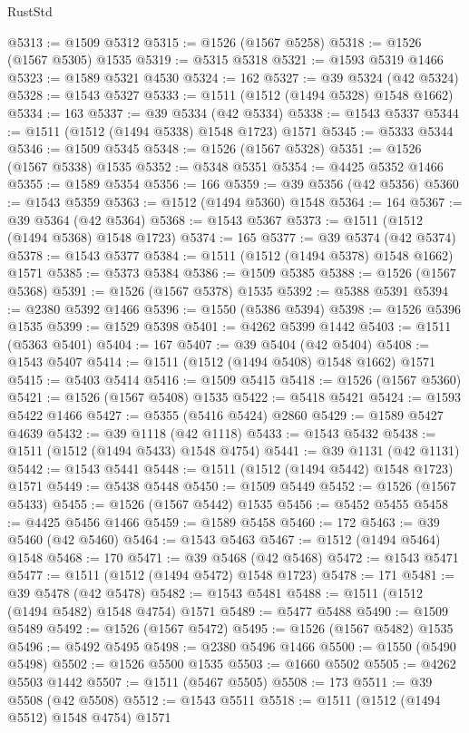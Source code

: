 \begin{lexlean}{RustStd}
\begin{coremodule}
{{@5313 := @1509 @5312
@5315 := @1526 (@1567 @5258)
@5318 := @1526 (@1567 @5305) @1535
@5319 := @5315 @5318
@5321 := @1593 @5319 @1466
@5323 := @1589 @5321 @4530
@5324 := 162
@5327 := @39 @5324 (@42 @5324)
@5328 := @1543 @5327
@5333 := @1511 (@1512 (@1494 @5328) @1548 @1662)
@5334 := 163
@5337 := @39 @5334 (@42 @5334)
@5338 := @1543 @5337
@5344 := @1511 (@1512 (@1494 @5338) @1548 @1723) @1571
@5345 := @5333 @5344
@5346 := @1509 @5345
@5348 := @1526 (@1567 @5328)
@5351 := @1526 (@1567 @5338) @1535
@5352 := @5348 @5351
@5354 := @4425 @5352 @1466
@5355 := @1589 @5354
@5356 := 166
@5359 := @39 @5356 (@42 @5356)
@5360 := @1543 @5359
@5363 := @1512 (@1494 @5360) @1548
@5364 := 164
@5367 := @39 @5364 (@42 @5364)
@5368 := @1543 @5367
@5373 := @1511 (@1512 (@1494 @5368) @1548 @1723)
@5374 := 165
@5377 := @39 @5374 (@42 @5374)
@5378 := @1543 @5377
@5384 := @1511 (@1512 (@1494 @5378) @1548 @1662) @1571
@5385 := @5373 @5384
@5386 := @1509 @5385
@5388 := @1526 (@1567 @5368)
@5391 := @1526 (@1567 @5378) @1535
@5392 := @5388 @5391
@5394 := @2380 @5392 @1466
@5396 := @1550 (@5386 @5394)
@5398 := @1526 @5396 @1535
@5399 := @1529 @5398
@5401 := @4262 @5399 @1442
@5403 := @1511 (@5363 @5401)
@5404 := 167
@5407 := @39 @5404 (@42 @5404)
@5408 := @1543 @5407
@5414 := @1511 (@1512 (@1494 @5408) @1548 @1662) @1571
@5415 := @5403 @5414
@5416 := @1509 @5415
@5418 := @1526 (@1567 @5360)
@5421 := @1526 (@1567 @5408) @1535
@5422 := @5418 @5421
@5424 := @1593 @5422 @1466
@5427 := @5355 (@5416 @5424) @2860
@5429 := @1589 @5427 @4639
@5432 := @39 @1118 (@42 @1118)
@5433 := @1543 @5432
@5438 := @1511 (@1512 (@1494 @5433) @1548 @4754)
@5441 := @39 @1131 (@42 @1131)
@5442 := @1543 @5441
@5448 := @1511 (@1512 (@1494 @5442) @1548 @1723) @1571
@5449 := @5438 @5448
@5450 := @1509 @5449
@5452 := @1526 (@1567 @5433)
@5455 := @1526 (@1567 @5442) @1535
@5456 := @5452 @5455
@5458 := @4425 @5456 @1466
@5459 := @1589 @5458
@5460 := 172
@5463 := @39 @5460 (@42 @5460)
@5464 := @1543 @5463
@5467 := @1512 (@1494 @5464) @1548
@5468 := 170
@5471 := @39 @5468 (@42 @5468)
@5472 := @1543 @5471
@5477 := @1511 (@1512 (@1494 @5472) @1548 @1723)
@5478 := 171
@5481 := @39 @5478 (@42 @5478)
@5482 := @1543 @5481
@5488 := @1511 (@1512 (@1494 @5482) @1548 @4754) @1571
@5489 := @5477 @5488
@5490 := @1509 @5489
@5492 := @1526 (@1567 @5472)
@5495 := @1526 (@1567 @5482) @1535
@5496 := @5492 @5495
@5498 := @2380 @5496 @1466
@5500 := @1550 (@5490 @5498)
@5502 := @1526 @5500 @1535
@5503 := @1660 @5502
@5505 := @4262 @5503 @1442
@5507 := @1511 (@5467 @5505)
@5508 := 173
@5511 := @39 @5508 (@42 @5508)
@5512 := @1543 @5511
@5518 := @1511 (@1512 (@1494 @5512) @1548 @4754) @1571
}}
\end{coremodule}
\end{lexlean}
